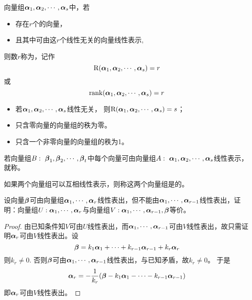 \begin{frame}
  \begin{dingyi}[向量组的秩]
    向量组$\boldsymbol{\alpha}_1,\boldsymbol{\alpha}_2,\cdots,\boldsymbol{\alpha}_s$中，若
    \begin{itemize}
    \item 存在$r$个的向量，
    \item 且其中可由这$r$个线性无关的向量线性表示, 
    \end{itemize}
    则数$r$称为，记作
    $$
    \mathrm{R}(\boldsymbol{\alpha}_1,\boldsymbol{\alpha}_2,\cdots,\boldsymbol{\alpha}_s)=r
    $$
    或
    $$
    \mathrm{rank}(\boldsymbol{\alpha}_1,\boldsymbol{\alpha}_2,\cdots,\boldsymbol{\alpha}_s)=r
    $$
  \end{dingyi}

\end{frame}

\begin{frame}
  \begin{itemize}
  \item 若$\boldsymbol{\alpha}_1,\boldsymbol{\alpha}_2,\cdots,\boldsymbol{\alpha}_s$线性无关，
    则$\mathrm{R}(\boldsymbol{\alpha}_1,\boldsymbol{\alpha}_2,\cdots,\boldsymbol{\alpha}_s)=s$；
  \item 只含零向量的向量组的秩为零。
  \item 只含一个非零向量的向量组的秩为1。
  \end{itemize}
\end{frame}

\begin{frame}
  \begin{dingyi}
    若向量组$B:~\boldsymbol{\beta}_1,\boldsymbol{\beta}_2,\cdots,\boldsymbol{\beta}_t$中每个向量可由向量组$A:~\boldsymbol{\alpha}_1,\boldsymbol{\alpha}_2,\cdots,\boldsymbol{\alpha}_s$线性表示，
    就称。 
    \vspace{0.1in}
    
    如果两个向量组可以互相线性表示，则称这两个向量组是的。
  \end{dingyi}
\end{frame}

\begin{frame}
  \begin{li}
    设向量$\boldsymbol{\beta}$可由向量组$\boldsymbol{\alpha}_1,\cdots,\boldsymbol{\alpha}_r$线性表出，但不能由$\boldsymbol{\alpha}_1,\cdots,\boldsymbol{\alpha}_{r-1}$线性表出，证明：向量组$U: \boldsymbol{\alpha}_1,\cdots,\boldsymbol{\alpha}_r$与向量组$V: \boldsymbol{\alpha}_1,\cdots,\boldsymbol{\alpha}_{r-1},\boldsymbol{\beta}$等价。
  \end{li}
  \pause
  \begin{proof}
    由已知条件知$V$可由$U$线性表出，而$\boldsymbol{\alpha}_1,\cdots,\boldsymbol{\alpha}_{r-1}$可由$V$线性表出，故只需证明$\boldsymbol{\alpha}_r$可由$V$线性表出。设
    $$
    \boldsymbol{\beta}=k_1\boldsymbol{\alpha}_1+\cdots+k_{r-1}\boldsymbol{\alpha}_{r-1}+k_r\boldsymbol{\alpha}_r
    $$
    则$k_r\ne 0$.
    否则$\boldsymbol{\beta}$可由$\boldsymbol{\alpha}_1,\cdots,\boldsymbol{\alpha}_{r-1}$线性表出，与已知矛盾，故$k_r\ne 0$。 于是
    $$
    \boldsymbol{\alpha}_r=-\frac1{k_r}(\boldsymbol{\beta}-k_1\boldsymbol{\alpha}_1-\cdots-k_{r-1}\boldsymbol{\alpha}_{r-1})
    $$
    即$\boldsymbol{\alpha}_r$可由$V$线性表出。
  \end{proof}
\end{frame}


